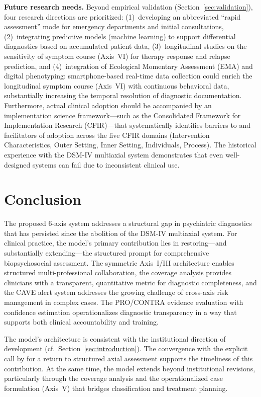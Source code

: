 \documentclass[11pt,a4paper]{article}
\begin{document}
\textbf{Future research needs.} Beyond empirical validation (Section~\ref{sec:validation}), four research directions are prioritized: (1)~developing an abbreviated ``rapid assessment'' mode for emergency departments and initial consultations, (2)~integrating predictive models (machine learning) to support differential diagnostics based on accumulated patient data, (3)~longitudinal studies on the sensitivity of symptom course (Axis~VI) for therapy response and relapse prediction, and (4)~integration of Ecological Momentary Assessment (EMA) and digital phenotyping: smartphone-based real-time data collection could enrich the longitudinal symptom course (Axis~VI) with continuous behavioral data, substantially increasing the temporal resolution of diagnostic documentation. Furthermore, actual clinical adoption should be accompanied by an implementation science framework---such as the Consolidated Framework for Implementation Research (CFIR)---that systematically identifies barriers to and facilitators of adoption across the five CFIR domains (Intervention Characteristics, Outer Setting, Inner Setting, Individuals, Process). The historical experience with the DSM-IV multiaxial system demonstrates that even well-designed systems can fail due to inconsistent clinical use.

\section{Conclusion}
\label{sec:conclusion}

The proposed 6-axis system addresses a structural gap in psychiatric diagnostics that has persisted since the abolition of the DSM-IV multiaxial system. For clinical practice, the model's primary contribution lies in restoring---and substantially extending---the structured prompt for comprehensive biopsychosocial assessment. The symmetric Axis~I/III architecture enables structured multi-professional collaboration, the coverage analysis provides clinicians with a transparent, quantitative metric for diagnostic completeness, and the CAVE alert system addresses the growing challenge of cross-axis risk management in complex cases. The PRO/CONTRA evidence evaluation with confidence estimation operationalizes diagnostic transparency in a way that supports both clinical accountability and training.

The model's architecture is consistent with the institutional direction of development (cf.\ Section~\ref{sec:introduction}). The convergence with the explicit call by \citet{ErlichFirst2025} for a return to structured axial assessment supports the timeliness of this contribution. At the same time, the model extends beyond institutional revisions, particularly through the coverage analysis and the operationalized case formulation (Axis~V) that bridges classification and treatment planning.
\end{document}
